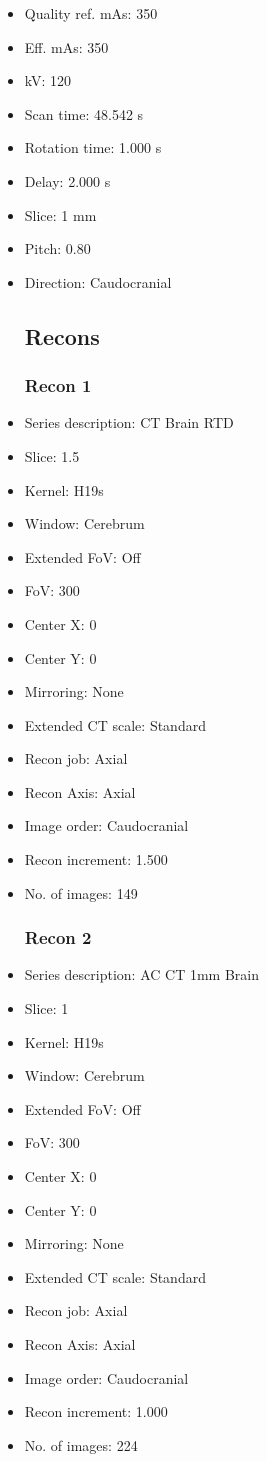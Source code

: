\documentclass[12pt]{article}
\begin{document}
\begin{itemize}[noitemsep]
\subsection{Scan}
\item Quality ref. mAs: 350\item Eff. mAs: 350\item kV: 120\item Scan time: 48.542 s\item Rotation time: 1.000 s\item Delay: 2.000 s\item Slice: 1 mm\item Pitch: 0.80\item Direction: Caudocranial\subsection{Recons}

\subsubsection{Recon 1}
\item Series description: CT Brain RTD
\item Slice: 1.5
\item Kernel: H19s
\item Window: Cerebrum
\item Extended FoV: Off
\item FoV: 300
\item Center X: 0
\item Center Y: 0
\item Mirroring: None
\item Extended CT scale: Standard
\item Recon job: Axial
\item Recon Axis: Axial
\item Image order: Caudocranial
\item Recon increment: 1.500
\item No. of images: 149
\subsubsection{Recon 2}
\item Series description: AC CT 1mm Brain
\item Slice: 1
\item Kernel: H19s
\item Window: Cerebrum
\item Extended FoV: Off
\item FoV: 300
\item Center X: 0
\item Center Y: 0
\item Mirroring: None
\item Extended CT scale: Standard
\item Recon job: Axial
\item Recon Axis: Axial
\item Image order: Caudocranial
\item Recon increment: 1.000
\item No. of images: 224

\end{itemize}
\end{document}
